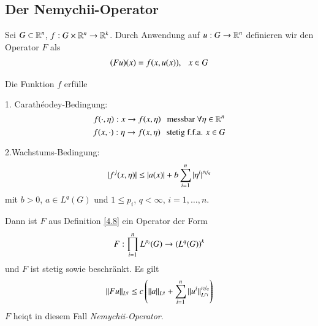 \subsection{Der Nemychii-Operator}

\begin{defi}\label{4.8}
    Sei $G\subset \mathbb{R}^n$, $f:G\times \mathbb{R}^n\rightarrow \mathbb{R}^k$. Durch Anwendung auf $u:G\rightarrow \mathbb{R}^n$ definieren
    wir den Operator $F$ als
    \begin{align}
        (Fu)(x)=f(x,u(x)), \hspace{.25cm} x\in G
    \end{align}
\end{defi}

\begin{lem}\label{4.9}
    Die Funktion $f$ erfülle
    \begin{description}
        \item{1. Carathéodey-Bedingung:}
        \[
            f(\cdot,\eta): x \rightarrow f(x,\eta) \hspace{.25cm} \text{messbar } \forall \eta\in \mathbb{R}^n
        \]
        \[
            f(x,\cdot):\eta\rightarrow f(x,\eta) \hspace{.25cm} \text{stetig f.f.a. } x\in G
        \]
        \item{2.Wachstums-Bedingung:}
        \[
            |f^j(x,\eta)|\leq |a(x)|+ b \sum_{i=1}^n|\eta^i|^{\nicefrac{p_i}{q}}
        \]
        mit $b>0$, $a\in L^q(G)$ und $1\leq p_i$, $q<\infty$, $i=1,…,n$. 
    \end{description}
    Dann ist $F$ aus Definition \ref{4.8} ein Operator der Form
    \[
        F:\prod_{i=1}^n L^{p_i}(G) \rightarrow (L^q(G))^k
    \]
    und $F$ ist stetig sowie beschränkt. Es gilt
    \[
        \|Fu\|_{L^q}\leq c\left( \|a\|_{L^q} + \sum_{i=1}^n \|u^i\|_{L^{p_i}}^{\nicefrac{p_i}{q}} \right)
    \]
    $F$ heiqt in diesem Fall \textit{Nemychii-Operator}.
\end{lem}

